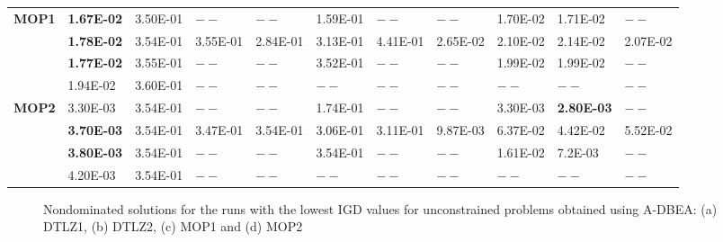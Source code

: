\begin{table*}[!htb]
\begin{tabular}{|l|l|l|l|l|l|l|l|l|l|l|}
		\textbf{MOP1}    & \textbf{1.67E-02} & 3.50E-01    & $--$             & $--$              & 1.59E-01           & $--$                & $--$                & 1.70E-02           & 1.71E-02            & $--$                 \\ \cline{2-11} 
		\textbf{}        & \textbf{1.78E-02} & 3.54E-01    & 3.55E-01         & 2.84E-01          & 3.13E-01           & 4.41E-01            & 2.65E-02            & 2.10E-02           & 2.14E-02            & 2.07E-02             \\ \cline{2-11} 
		\textbf{}        & \textbf{1.77E-02} & 3.55E-01    & $--$             & $--$              & 3.52E-01           & $--$                & $--$                & 1.99E-02           & 1.99E-02            & $--$                 \\ \cline{2-11} 
		\textbf{}        & 1.94E-02          & 3.60E-01    & $--$             & $--$              & $--$               & $--$                & $--$                & $--$               & $--$                & $--$                 \\ \hline
		\textbf{MOP2}    & 3.30E-03          & 3.54E-01    & $--$             & $--$              & 1.74E-01           & $--$                & $--$                & 3.30E-03           & \textbf{2.80E-03}   & $--$                 \\ \cline{2-11} 
		\textbf{}        & \textbf{3.70E-03} & 3.54E-01    & 3.47E-01         & 3.54E-01          & 3.06E-01           & 3.11E-01            & 9.87E-03            & 6.37E-02           & 4.42E-02            & 5.52E-02             \\ \cline{2-11} 
		\textbf{}        & \textbf{3.80E-03} & 3.54E-01    & $--$             & $--$              & 3.54E-01           & $--$                & $--$                & 1.61E-02           & 7.2E-03             & $--$                 \\ \cline{2-11} 
		\textbf{}        & 4.20E-03          & 3.54E-01    & $--$             & $--$              & $--$               & $--$                & $--$                & $--$               & $--$                & $--$                 \\ \hline               
	\end{tabular}
\end{table*}																								



\begin{figure*}[!htb]
	\centering
	\caption{Nondominated solutions for the runs with the lowest IGD values for unconstrained problems obtained using A-DBEA: (a) DTLZ1, (b) DTLZ2, (c) MOP1 and (d) MOP2}
	\label{fig:frontunc}
\end{figure*}

